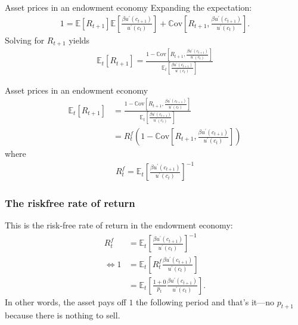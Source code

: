 \documentclass[presentation]{beamer}
\begin{document}
\begin{frame}[label=sec-4-3]{Asset prices in an endowment economy}
Expanding the expectation: 
\begin{align*}
1 = \mathbb{E} \left[ R_{t+1} \right] \mathbb{E} \left[ \frac{\beta u^{\prime}(c_{t+1})}{u^{\prime}(c_{t})} \right] + \mathbb{C} \text{ov} \left[ R_{t+1}, \frac{\beta u^{\prime}(c_{t+1})}{u^{\prime}(c_{t})} \right].
\end{align*}
Solving for $R_{t+1}$ yields
\begin{align*}
\mathbb{E}_{t} \left[ R_{t+1} \right] = \frac{1 - \mathbb{C} \text{ov} \left[ R_{t+1}, \frac{\beta u^{\prime}(c_{t+1})}{u^{\prime}(c_{t})} \right]}{ \mathbb{E}_{t} \left[ \frac{\beta u^{\prime}(c_{t+1})}{u^{\prime}(c_{t})} \right]}
\end{align*}
\end{frame}
\begin{frame}[label=sec-4-4]{Asset prices in an endowment economy}
\begin{align*}
\mathbb{E}_{t} \left[ R_{t+1} \right] &= \frac{1 - \mathbb{C} \text{ov} \left[ R_{t+1}, \frac{\beta u^{\prime}(c_{t+1})}{u^{\prime}(c_{t})} \right]}{ \mathbb{E}_{t} \left[ \frac{\beta u^{\prime}(c_{t+1})}{u^{\prime}(c_{t})} \right]} \\
&= R^{f}_{t} \left( 1 - \mathbb{C} \text{ov} \left[ R_{t+1}, \frac{\beta u^{\prime}(c_{t+1})}{u^{\prime}(c_{t})} \right] \right)
\end{align*}
where
\begin{align*}
R^{f}_{t} = \mathbb{E}_{t} \left[ \frac{\beta u^{\prime}(c_{t+1})}{u^{\prime}(c_{t})} \right]^{-1} 
\end{align*}
\end{frame}

\begin{frame}
\frametitle{The riskfree rate of return}
This is the risk-free rate of return in the endowment economy:
\begin{align*}
R^{f}_{t} &= \mathbb{E}_{t} \left[ \frac{\beta u^{\prime}(c_{t+1})}{u^{\prime}(c_{t})} \right]^{-1} \\
\iff 1 &= \mathbb{E}_{t} \left[ R^{f}_{t} \frac{\beta u^{\prime}(c_{t+1})}{u^{\prime}(c_{t})} \right] \\
&= \mathbb{E}_{t} \left[ \frac{1 + 0}{p_{t}} \frac{\beta u^{\prime}(c_{t+1})}{u^{\prime}(c_{t})} \right].
\end{align*}
In other words, the asset pays off $1$ the following period and that's it---no $p_{t+1}$ because there is nothing to sell.
\end{frame}
\end{document}
